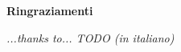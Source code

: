 \thispagestyle{empty}

\begin{center}
  {\bf \Huge Ringraziamenti}
\end{center}

\vspace{4cm}


\emph{
  ...thanks to... TODO (in italiano)
}
